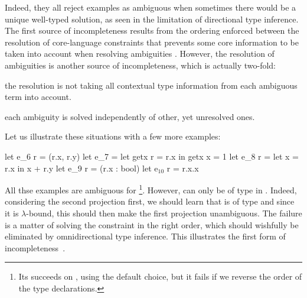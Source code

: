 \documentclass[acmsmall,screen,nonacm]{acmart}
\begin{document}
Indeed, they all reject examples as ambiguous when sometimes there would be
a unique well-typed solution, as seen in the limitation of directional type
inference.  The first source of incompleteness results from the ordering
enforced between the resolution of core-language constraints that prevents
some core information to be taken into account when resolving ambiguities
.
%
However, the resolution of ambiguities is another source of
incompleteness, which is actually two-fold:
\begin{enumerate*}
\item[\llabel {item/info}]
  the resolution is not taking all contextual type information from
  each ambiguous term into account.
\item[\llabel {item/simultaneous}]
  each ambiguity is solved independently of other, yet unresolved ones.
\end{enumerate*}

Let us illustrate these situations with a few more examples:
\begin{program}[error]
let e_6 r = (r.x, r.y)
let e_7 = let getx r = r.x in getx {x = 1}
let e_8 r = let x = r.x in x + r.y
let e_9 r = (r.x : bool)
let e$_{10}$ r = r.x.x
\end{program}
All thse examples are ambiguous for \OCaml\footnote{Its succeeds on ,
using the default choice, but it fails if we reverse the order of the type
declarations.}.  However,  can only be of type
 in . Indeed, considering the second projection first,
we should learn that  is of type  and since it is
$\lambda$-bound, this should then make the first projection unambiguous.
The failure is a matter of solving the constraint in the right order, which
should wishfully be eliminated by omnidirectional type inference.
This illustrates the first form of incompleteness~.

\end{document}
